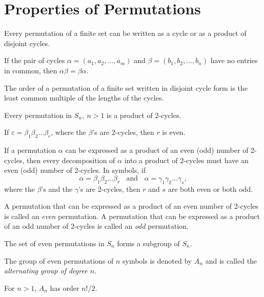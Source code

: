 \section{Properties of Permutations}

\begin{theorem}
	Every permutation of a finite set can be written as a cycle or as a product of disjoint cycles.
\end{theorem}

\begin{theorem}
	If the pair of cycles $\alpha = (a_1, a_2, \dots, a_m)$ and $\beta = (b_1, b_2, \dots, b_n)$ have no entries in common, then $\alpha\beta = \beta\alpha$.
\end{theorem}

\begin{theorem}
	The order of a permutation of a finite set written in disjoint cycle form is the least common multiple of the lengths of the cycles.
\end{theorem}

\begin{theorem}
	Every permutation in $S_n,\ n>1$ is a product of 2-cycles.
\end{theorem}

\begin{lem}
	If $\varepsilon = \beta_1\beta_2\dots\beta_r$, where the $\beta$'s are 2-cycles, then $r$ is even.
\end{lem}

\begin{theorem}
	If a permutation $\alpha$ can be expressed as a product of an even (odd) number of 2-cycles, then every decomposition of $\alpha$ into a product of 2-cycles must have an even (odd) number of 2-cycles. In symbols, if
	\[ \alpha = \beta_1\beta_2\dots\beta_r\ \ \ \ \text{and}\ \ \ \ \alpha=\gamma_1\gamma_2\dots\gamma_s, \]
	where the $\beta$'s and the $\gamma$'s are 2-cycles, then $r$ and $s$ are both even or both odd.
\end{theorem}

\begin{definition}
	A permutation that can be expressed as a product of an even number of 2-cycles is called an \textit{even} permutation. A permutation that can be expressed as a product of an odd number of 2-cycles is called an \textit{odd} permutation.
\end{definition}

\begin{theorem}
	The set of even permutations in $S_n$ forms a subgroup of $S_n$.
\end{theorem}

\begin{definition}
	The group of even permutations of $n$ symbols is denoted by $A_n$ and is called the \textit{alternating group of degree $n$}.
\end{definition}

\begin{theorem}
	For $n > 1$, $A_n$ has order $n!/2$.
\end{theorem}
